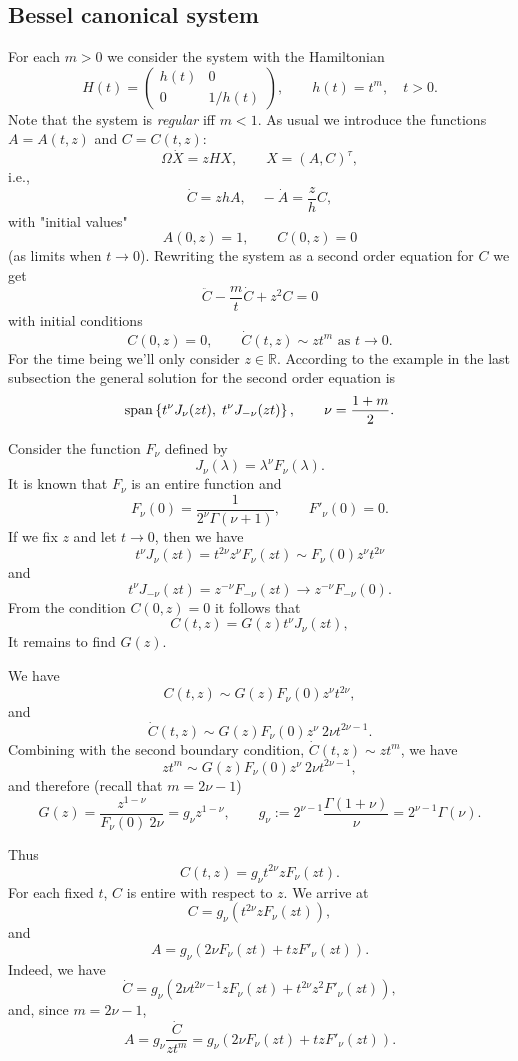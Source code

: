 \documentclass[11pt,twoside,reqno]{amsart}
\def\to{\rightarrow}
\def\ms{\bigskip}
\def\ms{\medskip}
\def\no{\noindent}
\def\R{{\mathbb R}}
\theoremstyle{plain}
\numberwithin{equation}{section}
\begin{document}
\ms\subsection{Bessel canonical system} For each $m>0$ we consider the system with the Hamiltonian
$$H(t)=\begin{pmatrix}
   h(t)   & 0 \\
     0& 1/ h(t)
\end{pmatrix}, \qquad h(t)=t^m,\quad t>0.$$
Note that the system is {\it regular} iff $m<1$.  As usual we introduce the functions $A=A(t,z)$ and $C=C(t,z)$:
$$\Omega\dot X=zHX,\qquad X=(A, C)^\tau,$$
i.e.,
$$\dot C=zhA,\quad -\dot A=\frac z h C,$$
with "initial values"
$$A(0, z)=1, \qquad C(0, z)=0$$
(as limits when $t\to 0$). Rewriting the system as a second order equation for $C$ we get
$$\ddot C-\frac mt\dot C+z^2C=0$$ 
with initial conditions
$$C(0,z)=0,\qquad \dot C(t,z)\sim zt^m\text{ as }t\to 0.$$
For the time being we'll only consider $z\in\R$. According to the example in the last subsection the general solution for the second order 
equation is
$${\rm span} \left\{t^\nu  J_\nu(z t),\;
t^\nu J_{-\nu}(z t)\right\},\qquad \nu=\frac{1+m}2.$$

Consider the function $F_\nu$ defined by
$$J_\nu(\lambda)=\lambda^\nu F_\nu(\lambda).$$
It is known that $F_\nu$ is an entire function and
$$F_\nu(0)=\frac1{2^\nu\Gamma(\nu+1)},\qquad F'_\nu(0)=0.$$
If we fix $z$ and let $t\to 0$, then we have
$$t^\nu J_\nu(zt)=t^{2\nu}z^\nu F_\nu(zt)\sim F_\nu(0) z^\nu t^{2\nu}$$
and 
$$t^\nu J_{-\nu}(zt)=z^{-\nu }F_{-\nu}(zt) \to z^{-\nu}F_{-\nu}(0).$$
From the condition $C(0,z)=0$ it follows that
$$C(t,z)=G(z)t^\nu J_\nu(zt),$$
It remains to find $G(z)$. 

\ms\no We have 
$$C(t,z) \sim G(z)  F_\nu(0) z^\nu t^{2\nu},$$
and
$$ \dot C(t,z) \sim G(z)  F_\nu(0) z^\nu ~ 2\nu t^{2\nu-1}.$$
Combining with the second boundary condition, 
$
 \dot C(t,z)\sim zt^m$, we have
$$zt^m\sim G(z)  F_\nu(0) z^\nu ~ 2\nu t^{2\nu-1},$$
 and therefore (recall that $m=2\nu-1$)
 $$ G(z)=\frac{z^{1-\nu}}{F_\nu(0) ~2\nu}=g_\nu z^{1-\nu},\qquad g_\nu:=2^{\nu-1}\frac{\Gamma(1+\nu)}\nu=2^{\nu-1}\Gamma(\nu).$$
 
 
 Thus
 $$C(t,z)=g_\nu t^{2\nu}z F_\nu(zt).$$
 For each fixed $t$, $C$ is entire with respect to $z$. We arrive at
 $$C=g_\nu(t^{2\nu} z F_\nu(zt)),$$
 and 
 $$A=g_\nu(2\nu F_\nu(zt)+tz F'_\nu(zt)).$$
Indeed, we have
 $$\dot C=g_\nu(2\nu t^{2\nu-1} zF_\nu(zt)+t^{2\nu}z^2 F'_\nu(zt)),$$
 and, since $m=2\nu-1$,
 $$A=g_\nu\frac{\dot C}{zt^m}=g_\nu(2\nu F_\nu(zt)+tz F'_\nu(zt)).$$ 
\end{document}
